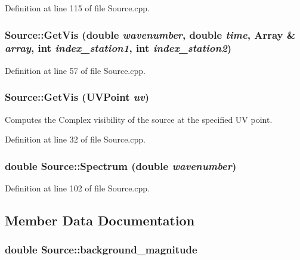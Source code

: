 Definition at line 115 of file Source.cpp.

\hypertarget{classSource_ad802ea02880525552b1feea0bde38244}{
\subsubsection[{GetVis}]{ Source::GetVis (double {\em wavenumber}, \/  double {\em time}, \/  {\bf Array} \& {\em array}, \/  int {\em index\_\-station1}, \/  int {\em index\_\-station2})}}
\label{classSource_ad802ea02880525552b1feea0bde38244}


Definition at line 57 of file Source.cpp.

\hypertarget{classSource_ad87c09b8cc1ee838435de12a93495e1e}{
\subsubsection[{GetVis}]{ Source::GetVis ({\bf UVPoint} {\em uv})}}
\label{classSource_ad87c09b8cc1ee838435de12a93495e1e}


Computes the Complex visibility of the source at the specified UV point. 



Definition at line 32 of file Source.cpp.

\hypertarget{classSource_a1b9f408aa6c5dcd5550e9cb28922e3af}{
\subsubsection[{Spectrum}]{\setlength{\rightskip}{0pt plus 5cm}double Source::Spectrum (double {\em wavenumber})}}
\label{classSource_a1b9f408aa6c5dcd5550e9cb28922e3af}


Definition at line 102 of file Source.cpp.



\subsection{Member Data Documentation}
\hypertarget{classSource_af8077dd4bf90295d11680d6dbd0baea9}{
\subsubsection[{background\_\-magnitude}]{\setlength{\rightskip}{0pt plus 5cm}double {\bf Source::background\_\-magnitude}}}
\label{classSource_af8077dd4bf90295d11680d6dbd0baea9}


